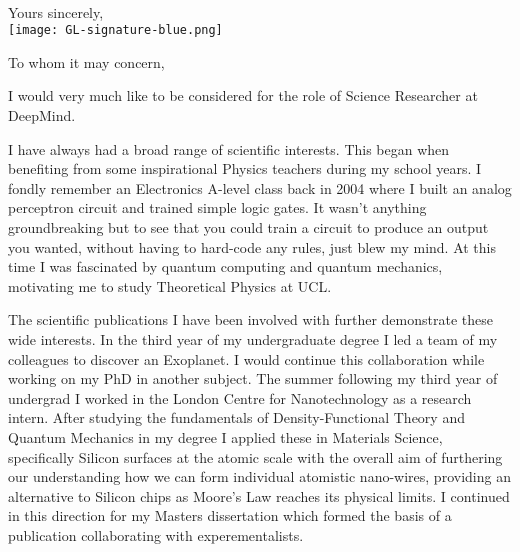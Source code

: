 \documentclass[11pt,a4paper,sans]{moderncv}        %
\begin{document}

\clearpage
\recipient{~}{~}
\date{\vspace*{-0.5cm}~}
\opening{\vspace*{-3cm}~}
\closing{Yours sincerely, \\ \hspace*{-0.3cm}
\texttt{[image: GL-signature-blue.png]} 
\vspace*{-1cm}
}
\makelettertitle
%
To whom it may concern,
%

I would very much like to be considered for the role of Science Researcher at DeepMind.

%
I have always had a broad range of scientific interests. 
This began when benefiting from some inspirational 
Physics teachers during my school years. I fondly remember an 
Electronics A-level class back in 2004 where I 
built an analog perceptron circuit and trained 
simple logic gates. It wasn't anything groundbreaking 
but to see that you could train a circuit to produce 
an output you wanted, without having to hard-code 
any rules, just blew my mind. 
%
At this time I was fascinated by quantum computing 
and quantum mechanics, motivating me to study 
Theoretical Physics at UCL.
%

The scientific publications I have been involved with further
demonstrate these wide interests. 
In the third year of my undergraduate degree I led a 
team of my colleagues to discover an 
Exoplanet\cite{habitable}. 
I would continue this collaboration\cite{exofit_mnras} 
while working on my PhD in another subject. 
The summer following my third year of undergrad 
I worked in the London Centre for Nanotechnology as a 
research intern. After studying the fundamentals 
of Density-Functional Theory and Quantum Mechanics in my 
degree I applied these in 
Materials Science, specifically Silicon surfaces at the 
atomic scale \cite{stm_aps} with the overall aim
of furthering our understanding how we can form 
individual atomistic nano-wires, providing an alternative
to Silicon chips as Moore's Law
reaches its physical limits.
%
I continued in this direction for my Masters 
dissertation which formed the basis of a 
publication collaborating with
experementalists\cite{prb_silicon}.
%
\end{document}
